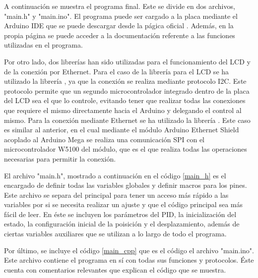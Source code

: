 A continuación se muestra el programa final. Este se divide en dos archivos, "main.h" y "main.ino". El programa puede ser 
cargado a la placa mediante el Arduino IDE que se puede descargar desde la págica oficial \cite{arduino}. Además, en la propia
página se puede acceder a la documentación referente a las funciones utilizadas en el programa.

Por otro lado, dos librerías han sido utilizadas para el funcionamiento del LCD y de la conexión por Ethernet. Para el caso
de la librería para el LCD se ha utilizado la librería \cite{lcd}, ya que la conexión se realiza mediante protocolo I2C.
Este protocolo permite que un segundo microcontrolador integrado dentro de la placa del LCD sea el que lo controle, evitando
tener que realizar todas las conexiones que requiere el mismo directamente hacia el Arduino y delegando el control al mismo.
Para la conexión mediante Ethernet se ha utilizado la librería \cite{ethernet}. Este caso es similar al anterior, en el cual
mediante el módulo Arduino Ethernet Shield acoplado al Arduino Mega se realiza una comunicación SPI con el microcontrolador 
W5100 del módulo, que es el que realiza todas las operaciones necesarias para permitir la conexión.

El archivo "main.h", mostrado a continuación en el código \ref{main_h} es el encargado de definir todas las variables globales
y definir macros para los pines. Este archivo se separa del principal para tener un acceso más rápido a las variables por si 
se necesita realizar un ajuste y que el código principal sea más fácil de leer. En éste se incluyen los parámetros del PID,
la inicialización del estado, la configuración inicial de la poisición y el desplazamiento, además de ciertas variables auxiliares
que se utilizan a lo largo de todo el programa.



Por último, se incluye el código \ref{main_cpp} que es el código el archivo "main.ino". Este archivo contiene el programa en sí
con todas sus funciones y protocolos. Éste cuenta con comentarios relevantes que explican el código que se muestra.

